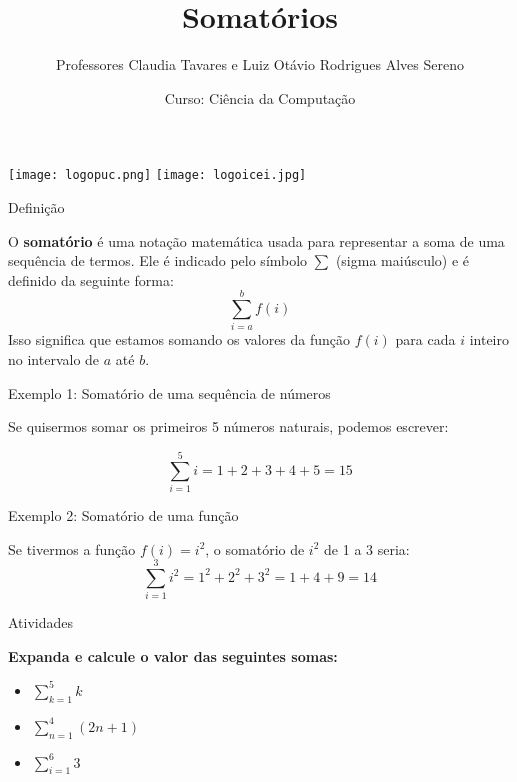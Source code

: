 \documentclass{beamer} %
\title{Somatórios}
\author{Professores Claudia Tavares e Luiz Otávio Rodrigues Alves Sereno}
\date{Curso: Ciência da Computação}
\begin{document}
\begin{frame}
    \titlepage
    \vfill
    \begin{center}
    \vspace{-0.9cm}
        \texttt{[image: logopuc.png]} \hspace{1.4cm}
        \texttt{[image: logoicei.jpg]}
    \end{center}
\end{frame}

\begin{frame}{Definição}
    
    O \textbf{somatório} é uma notação matemática usada para representar a soma de uma sequência de termos. Ele é indicado pelo símbolo \(\displaystyle \sum\) (sigma maiúsculo) e é definido da seguinte forma:
    $$
    \displaystyle \sum_{i=a}^{b} f(i)
    $$
    Isso significa que estamos somando os valores da função \( f(i) \) para cada \( i \) inteiro no intervalo de \( a \) até \( b \).
\end{frame}

\begin{frame}{Exemplo 1: Somatório de uma sequência de números}
    
Se quisermos somar os primeiros 5 números naturais, podemos escrever:

    \[
    \displaystyle \sum_{i=1}^{5} i = 1 + 2 + 3 + 4 + 5 = 15
    \]
\end{frame}

\begin{frame}{Exemplo 2: Somatório de uma função}
    
    
    Se tivermos a função \( f(i) = i^2 \), o somatório de \( i^2 \) de 1 a 3 seria:
    \[
    \displaystyle \sum_{i=1}^{3} i^2 = 1^2 + 2^2 + 3^2 = 1 + 4 + 9 = 14
    \]
\end{frame}

\begin{frame}{Atividades}
    
\textbf{Expanda e calcule o valor das seguintes somas:}
    \begin{itemize}
        \item $ \displaystyle \sum_{k=1}^{5} k $
        \item $ \displaystyle \sum_{n=1}^{4} (2n + 1)$
        \item $ \displaystyle \sum_{i=1}^{6} 3 $
    \end{itemize}
\end{frame}
    
\end{document}
